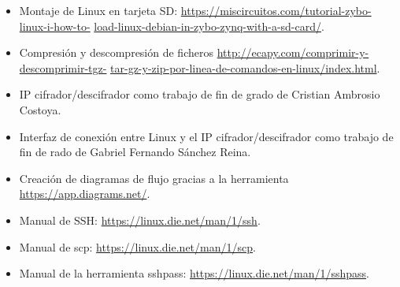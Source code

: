 \begin{itemize}
	\item Montaje de Linux en tarjeta SD:  \url{https://miscircuitos.com/tutorial-zybo-linux-i-how-to-} \url{load-linux-debian-in-zybo-zynq-with-a-sd-card/}.
	
	\item Compresión y descompresión de ficheros \url{http://ecapy.com/comprimir-y-descomprimir-tgz-} \url{tar-gz-y-zip-por-linea-de-comandos-en-linux/index.html}.
	
	\item IP cifrador/descifrador como trabajo de fin de grado de Cristian Ambrosio Costoya.
	
	\item Interfaz de conexión entre Linux y el IP cifrador/descifrador como trabajo de fin de rado de Gabriel Fernando Sánchez Reina.
	
	\item Creación de diagramas de flujo gracias a la herramienta \url{https://app.diagrams.net/}.
	
	\item Manual de SSH: \url{https://linux.die.net/man/1/ssh}.
	
	\item Manual de scp: \url{https://linux.die.net/man/1/scp}.
	
	\item Manual de la herramienta sshpass: \url{https://linux.die.net/man/1/sshpass}.
\end{itemize}
